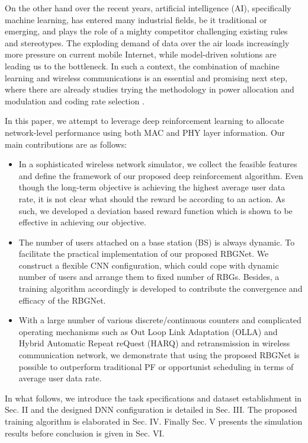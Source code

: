 \documentclass[conference,compsocconf]{IEEEtran}
\begin{document}
	On the other hand over the recent years, artificial intelligence (AI), specifically machine learning, has entered many industrial fields, be it traditional or emerging, and plays the role of a mighty competitor challenging existing rules and stereotypes. The exploding demand of data over the air loads increasingly more pressure on current mobile Internet, while model-driven solutions are leading us to the bottleneck. In such a context, the combination of machine learning and wireless communications is an essential and promising next step, where there are already studies trying the methodology in power allocation \cite{sun2018learning,sato2019approximation} and modulation and coding rate selection \cite{bruno2014robust}.
	
	In this paper, we attempt to leverage deep reinforcement learning to allocate network-level performance using both MAC and PHY layer information. Our main contributions are as follows:
	\begin{itemize}
		\item In a sophisticated wireless network simulator, we collect the feasible  features and define the framework of our proposed deep reinforcement algorithm. Even though the long-term objective is achieving the highest average user data rate, it is not clear what should the reward be according to an action. As such, we developed a deviation based reward function which is shown to be effective in achieving our objective.
		\item The number of users attached on a base station (BS) is always dynamic. To facilitate the practical implementation of our proposed RBGNet. We construct a flexible CNN configuration, which could cope with dynamic number of users and arrange them to fixed number of RBGs. Besides, a training algorithm accordingly is developed to contribute the convergence and efficacy of the RBGNet.
		\item With a large number of various discrete/continuous counters and complicated operating mechanisms such as Out Loop Link Adaptation (OLLA) and Hybrid Automatic Repeat reQuest (HARQ) and retransmission in wireless communication network, we demonstrate that using the proposed RBGNet is possible to outperform traditional PF or opportunist scheduling in terms of average user data rate.
	\end{itemize}
	

	
	In what follows, we introduce the task specifications and dataset establishment in Sec. II and the designed DNN configuration is detailed in Sec. III. The proposed training algorithm is elaborated in Sec. IV. Finally Sec. V presents the simulation results before conclusion is given in Sec. VI.
	
\end{document}
